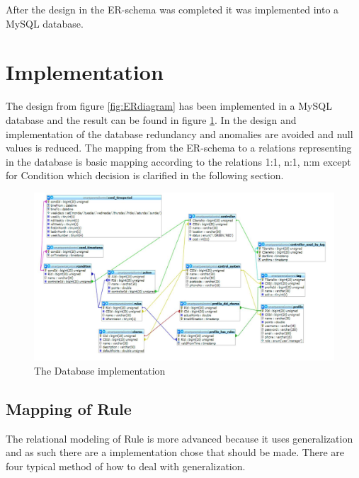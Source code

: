 After the design in the ER-schema was completed it was implemented into a MySQL database.  

\section{Implementation}

The design from figure \ref{fig:ERdiagram} has been implemented in a MySQL database and the result can be found in figure \ref{fig:databaseDiagram}. In the design and implementation of the database redundancy and anomalies are avoided and null values is reduced. 
The mapping from the ER-schema to a relations representing in the database is basic mapping according to the relations 1:1, n:1, n:m except for Condition which decision is clarified in the following section. 

\begin{figure}
	\centering
		\includegraphics[width=1.00\textwidth]{images/databaseDiagram.jpg}
	\caption{The Database implementation}
	\label{fig:databaseDiagram}
\end{figure}

\subsection{Mapping of Rule}
\label{subsec:mappRule}
The relational modeling of Rule is more advanced because it uses generalization and as such there are a implementation chose that should be made. There are four typical method of how to deal with generalization.


